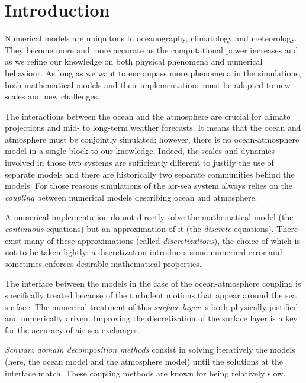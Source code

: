 
\chapter*{Introduction}
\label{ch:introduction}
Numerical models are ubiquitous in oceanography, climatology and
meteorology. They become more and more accurate as the
computational power increases and as we refine our knowledge on
both physical phenomena and numerical behaviour.
As long as we want to encompass more phenomena in the simulations,
both mathematical models and their implementations must be
adapted to new scales and new challenges.
\par %
The interactions between the ocean and the atmosphere are crucial
for climate projections and mid- to long-term weather forecasts.
It means that the ocean and atmosphere must be conjointly simulated;
however, there is no ocean-atmosphere model in a single
block to our knowledge.
Indeed, the scales and dynamics involved in those two systems are
sufficiently different to justify the use of separate models
and there are historically two separate communities behind the
models. For those reasons simulations of the air-sea system
always relies on the \textit{coupling} between numerical models describing
ocean and atmosphere.
\par %
A numerical implementation do not directly solve the mathematical
model (the \textit{continuous} equations) but an approximation of it
(the \textit{discrete} equations). There exist many of these
approximations (called \textit{discretizations}), the choice of which
is not to be taken lightly: a discretization introduces some
numerical error and sometimes enforces desirable mathematical
properties.
\par %
The interface between the models in the case of
the ocean-atmosphere coupling is specifically treated because
of the turbulent motions that appear around the sea surface. The
numerical treatment of this \textit{surface layer}
is both physically justified and numerically driven.
Improving the discretization of the surface
layer is a key for the accuracy of air-sea exchanges.
\par %
\textit{Schwarz domain decomposition methods} consist in solving
iteratively the models (here, the ocean model and the
atmosphere model) until the solutions at the interface match.
These coupling methods are known for being relatively slow.
